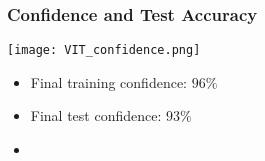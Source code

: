 \documentclass[../presentation.tex]{subfiles} %
\begin{document}
\begin{frame}
    
    \frametitle{Confidence and Test Accuracy}

    \begin{center}
        \texttt{[image: VIT\_confidence.png]}
    \end{center}

    \small{
    \begin{cbox}
        \begin{itemize}
            \item Final training confidence: $96\%$
            \item Final test confidence: $93\%$
            \item {}
        \end{itemize}
    \end{cbox}
    }

\end{frame}
\end{document}
